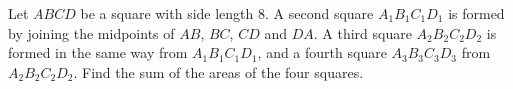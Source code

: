 Let $ABCD$ be a square with side length $8$. A second square $A_1B_1C_1D_1$ is formed by joining the midpoints of $AB$, $BC$, $CD$ and $DA$. A third square $A_2B_2C_2D_2$ is formed in the same way from $A_1B_1C_1D_1$, and a fourth square $A_3B_3C_3D_3$ from $A_2B_2C_2D_2$. Find the sum of the areas of the four squares.
